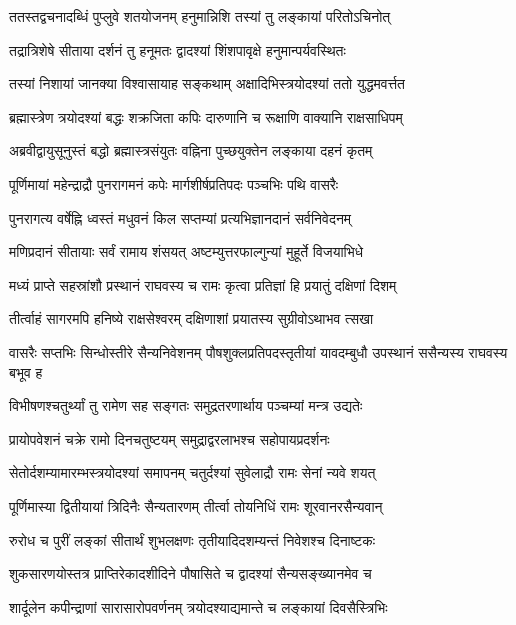 \twolineshloka
{ततस्तद्वचनादब्धिं पुप्लुवे शतयोजनम्}
{हनुमान्निशि तस्यां तु लङ्कायां परितोऽचिनोत्}%

\twolineshloka
{तद्रात्रिशेषे सीताया दर्शनं तु हनूमतः}
{द्वादश्यां शिंशपावृक्षे हनुमान्पर्यवस्थितः}%

\twolineshloka
{तस्यां निशायां जानक्या विश्वासायाह सङ्कथाम्}
{अक्षादिभिस्त्रयोदश्यां ततो युद्धमवर्त्तत}%

\twolineshloka
{ब्रह्मास्त्रेण त्रयोदश्यां बद्धः शक्रजिता कपिः}
{दारुणानि च रूक्षाणि वाक्यानि राक्षसाधिपम्}%

\twolineshloka
{अब्रवीद्वायुसूनुस्तं बद्धो ब्रह्मास्त्रसंयुतः}
{वह्निना पुच्छयुक्तेन लङ्काया दहनं कृतम्}%

\twolineshloka
{पूर्णिमायां महेन्द्राद्रौ पुनरागमनं कपेः}
{मार्गशीर्षप्रतिपदः पञ्चभिः पथि वासरैः}%

\twolineshloka
{पुनरागत्य वर्षेह्नि ध्वस्तं मधुवनं किल}
{सप्तम्यां प्रत्यभिज्ञानदानं सर्वनिवेदनम्}%

\twolineshloka
{मणिप्रदानं सीतायाः सर्वं रामाय शंसयत्}
{अष्टम्युत्तरफाल्गुन्यां मुहूर्ते विजयाभिधे}%

\twolineshloka
{मध्यं प्राप्ते सहस्रांशौ प्रस्थानं राघवस्य च}
{रामः कृत्वा प्रतिज्ञां हि प्रयातुं दक्षिणां दिशम्}%

\twolineshloka
{तीर्त्वाहं सागरमपि हनिष्ये राक्षसेश्वरम्}
{दक्षिणाशां प्रयातस्य सुग्रीवोऽथाभव त्सखा}%

\threelineshloka
{वासरैः सप्तभिः सिन्धोस्तीरे सैन्यनिवेशनम्}
{पौषशुक्लप्रतिपदस्तृतीयां यावदम्बुधौ}
{उपस्थानं ससैन्यस्य राघवस्य बभूव ह}%

\twolineshloka
{विभीषणश्चतुर्थ्यां तु रामेण सह सङ्गतः}
{समुद्रतरणार्थाय पञ्चम्यां मन्त्र उद्यतेः}%

\twolineshloka
{प्रायोपवेशनं चक्रे रामो दिनचतुष्टयम्}
{समुद्राद्वरलाभश्च सहोपायप्रदर्शनः}%

\twolineshloka
{सेतोर्दशम्यामारम्भस्त्रयोदश्यां समापनम्}
{चतुर्दश्यां सुवेलाद्रौ रामः सेनां न्यवे शयत्}%

\twolineshloka
{पूर्णिमास्या द्वितीयायां त्रिदिनैः सैन्यतारणम्}
{तीर्त्वा तोयनिधिं रामः शूरवानरसैन्यवान्}%

\twolineshloka
{रुरोध च पुरीं लङ्कां सीतार्थं शुभलक्षणः}
{तृतीयादिदशम्यन्तं निवेशश्च दिनाष्टकः}%

\twolineshloka
{शुकसारणयोस्तत्र प्राप्तिरेकादशीदिने}
{पौषासिते च द्वादश्यां सैन्यसङ्ख्यानमेव च}%

\twolineshloka
{शार्दूलेन कपीन्द्राणां सारासारोपवर्णनम्}
{त्रयोदश्याद्यमान्ते च लङ्कायां दिवसैस्त्रिभिः}%

